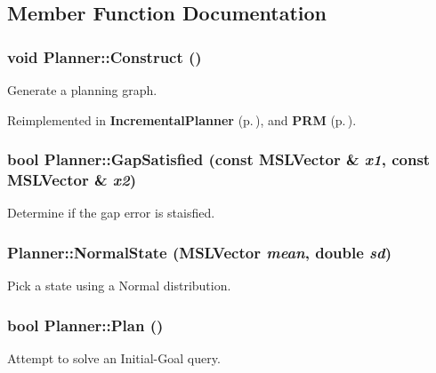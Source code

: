 \subsection{Member Function Documentation}
\subsubsection{\setlength{\rightskip}{0pt plus 5cm}void Planner::Construct ()\hspace{0.3cm}{\tt  [pure virtual]}}\label{class_Planner_a3}


Generate a planning graph.



Reimplemented in {\bf Incremental\-Planner} {\rm (p.\,\pageref{class_IncrementalPlanner_a2})}, and {\bf PRM} {\rm (p.\,\pageref{class_PRM_a2})}.
\subsubsection{\setlength{\rightskip}{0pt plus 5cm}bool Planner::Gap\-Satisfied (const {\bf MSLVector} \& {\em x1}, const {\bf MSLVector} \& {\em x2})}\label{class_Planner_a7}


Determine if the gap error is staisfied.

\subsubsection{ Planner::Normal\-State ({\bf MSLVector} {\em mean}, double {\em sd})\hspace{0.3cm}{\tt  [protected]}}\label{class_Planner_b1}


Pick a state using a Normal distribution.

\subsubsection{\setlength{\rightskip}{0pt plus 5cm}bool Planner::Plan ()\hspace{0.3cm}{\tt  [pure virtual]}}\label{class_Planner_a4}


Attempt to solve an Initial-Goal query.



